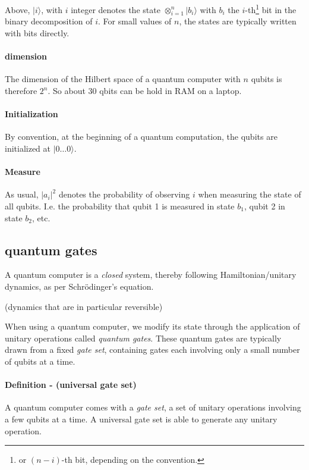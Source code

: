 \documentclass{article}
\begin{document}
Above, $|i\rangle$, with $i$ integer denotes the state $\otimes_{i=1}^{n} |b_i\rangle $ with $b_i$ the $i$-th\footnote{or $(n-i)$-th bit, depending on the
convention.} bit in the binary decomposition of $i$. For small values of $n$, the states are typically written with bits directly.

\paragraph{dimension} The dimension of the Hilbert space of a quantum computer with $n$ qubits is therefore $2^n$.
So about $30$ qbits can be hold in RAM on a laptop.

\paragraph{Initialization} By convention, at the beginning of a quantum computation, the qubits are initialized at $|0\dots 0\rangle$.

\paragraph{Measure} As usual, $|a_i|^2$ denotes the probability of observing $i$ when measuring the state of all qubits.
I.e. the probability that qubit 1 is measured in state $b_1$, qubit 2 in state $b_2$, etc.

\subsection{quantum gates} 

A quantum computer is a \emph{closed} system, thereby following Hamiltonian/unitary dynamics, as per Schr\"{o}dinger's equation.

(dynamics that are in particular reversible)

When using a quantum computer, we modify its state through the application of unitary operations called \emph{quantum gates}. 
These quantum gates are typically drawn from a fixed \emph{gate set}, containing gates each involving only a small number of qubits at a time.

\paragraph{Definition - (universal gate set)} A quantum computer comes with a \emph{gate set}, a set of unitary operations
involving a few qubits at a time. A universal gate set is able to generate any unitary operation.
\end{document}
